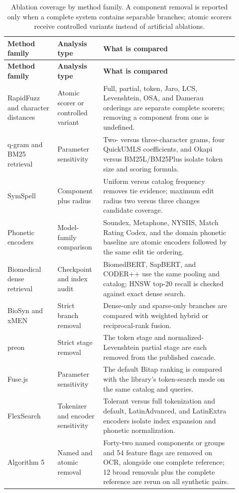 \begin{landscape}
\begin{scriptsize}
\setlength{\tabcolsep}{1.2pt}
\renewcommand{\arraystretch}{1.05}
\begin{longtable}{@{}L{0.20\linewidth}L{0.18\linewidth}L{0.54\linewidth}@{}}
\caption{Ablation coverage by method family. A component removal is reported only when a complete system contains separable branches; atomic scorers receive controlled variants instead of artificial ablations.}\label{tab:expanded-ablation-coverage}\\
\toprule
\textbf{Method family} & \textbf{Analysis type} & \textbf{What is compared} \\
\midrule
\endfirsthead
\toprule
\textbf{Method family} & \textbf{Analysis type} & \textbf{What is compared} \\
\midrule
\endhead
RapidFuzz and character distances & Atomic scorer or controlled variant & Full, partial, token, Jaro, LCS, Levenshtein, OSA, and Damerau orderings are separate complete scorers; removing a component from one is undefined. \\
q-gram and BM25 retrieval & Parameter sensitivity & Two- versus three-character grams, four QuickUMLS coefficients, and Okapi versus BM25L/BM25Plus isolate token size and scoring formula. \\
SymSpell & Component plus radius & Uniform versus catalog frequency removes tie evidence; maximum edit radius two versus three changes candidate coverage. \\
Phonetic encoders & Model-family comparison & Soundex, Metaphone, NYSIIS, Match Rating Codex, and the domain phonetic baseline are atomic encoders followed by the same edit tie ordering. \\
Biomedical dense retrieval & Checkpoint and index audit & BiomedBERT, SapBERT, and CODER++ use the same pooling and catalog; HNSW top-20 recall is checked against exact dense search. \\
BioSyn and xMEN & Strict branch removal & Dense-only and sparse-only branches are compared with weighted hybrid or reciprocal-rank fusion. \\
preon & Strict stage removal & The token stage and normalized-Levenshtein partial stage are each removed from the published cascade. \\
Fuse.js & Parameter sensitivity & The default Bitap ranking is compared with the library's token-search mode on the same catalog and queries. \\
FlexSearch & Tokenizer and encoder sensitivity & Tolerant versus full tokenization and default, LatinAdvanced, and LatinExtra encoders isolate index expansion and phonetic normalization. \\
Algorithm 5 & Named and atomic removal & Forty-two named components or groups and 54 feature flags are removed on OCR, alongside one complete reference; 12 broad removals plus the complete reference are rerun on all synthetic pairs. \\
\bottomrule
\end{longtable}
\end{scriptsize}

\end{landscape}

